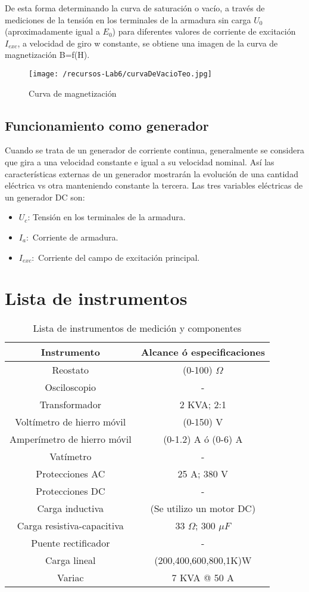 \documentclass[11pt,letterpaper]{article}     %
\begin{document}
De esta forma determinando la curva de saturación o vacío, a través de
mediciones de la tensión en los terminales de la armadura sin carga $U_{0}$
(aproximadamente igual a $E_{0}$) para diferentes valores de corriente de excitación $I_{exc}$, a velocidad de giro w constante, se obtiene una imagen de la curva de magnetización B=f(H).
\begin{figure}[H]
    \centering
    \texttt{[image: /recursos-Lab6/curvaDeVacioTeo.jpg]}
    \caption{Curva de magnetización}
    \label{fig:curvaDeVacioTeo}
\end{figure}
\subsection{Funcionamiento como generador}
Cuando se trata de un generador de corriente continua, generalmente se
considera que gira a una velocidad constante e igual a su velocidad nominal. Así
las características externas de un generador mostrarán la evolución de una
cantidad eléctrica vs otra manteniendo constante la tercera.
Las tres variables eléctricas de un generador DC son:
\begin{itemize}
    \item $U_{c}$: Tensión en los terminales de la armadura.
    \item $I_{a}:$ Corriente de armadura.
    \item $I_{exc}:$ Corriente del campo de excitación principal.
\end{itemize}
\section{Lista de instrumentos}
\begin{table}[H]
	\caption{Lista de instrumentos de medición y componentes}
	\centering
	\begin{tabular}{|c|c|}
		\hline 
		Instrumento & Alcance ó especificaciones \\ \hline 
		Reostato &  (0-100) $\Omega$ \\  
		\hline 
		Osciloscopio &  - \\ 
		\hline 
		Transformador &  2 KVA; 2:1 \\  
		\hline 
		Voltímetro de hierro móvil &  (0-150) V\\  
		\hline 
		Amperímetro de hierro móvil &(0-1.2) A ó (0-6) A \\ 
		\hline
		Vatímetro & -	\\
		\hline
		Protecciones AC & 25 A; 380 V\\ 
		\hline
		Protecciones DC & -\\ 
		\hline
		Carga inductiva& (Se utilizo un motor DC) \\ 
		\hline
		Carga resistiva-capacitiva& 33 $\Omega$; 300 $\mu F$ \\ 
		\hline
		Puente rectificador & -  \\
		\hline
		Carga lineal & (200,400,600,800,1K)W  \\
		\hline
		Variac & 7 KVA @ 50 A 
		\\
		\hline 
	\end{tabular} 
\end{table}
\end{document}
